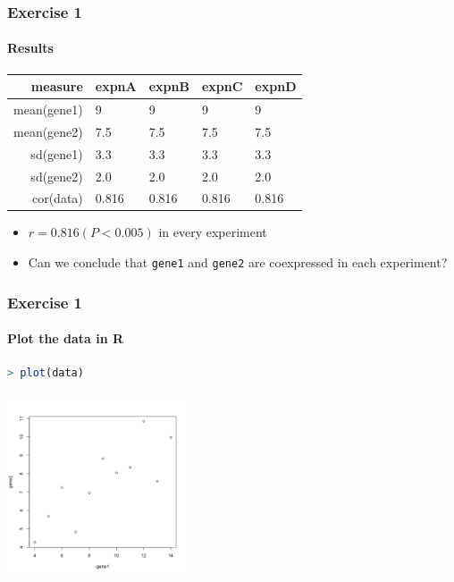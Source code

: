 \documentclass[table]{beamer}
\begin{document}
  \begin{frame}
    \frametitle{Exercise 1}
    \framesubtitle{Results}
    \begin{center}
	\begin{tabular}{r|l|l|l|l}
	  measure & expnA & expnB & expnC & expnD \\
	  \hline
	  mean(gene1) & 9     & 9     & 9     & 9 \\
	  mean(gene2) & 7.5   & 7.5   & 7.5   & 7.5 \\
  	  sd(gene1)   & 3.3   & 3.3   & 3.3   & 3.3 \\
  	  sd(gene2)   & 2.0   & 2.0   & 2.0   & 2.0 \\  
	  cor(data)   & 0.816 & 0.816 & 0.816 & 0.816 \\  
	\end{tabular}
	\end{center}
	\begin{itemize}
      \item<2-> $r=0.816 (P<0.005)$ in every experiment
      \item<2-> Can we conclude that \texttt{gene1} and \texttt{gene2} are coexpressed in each experiment?
    \end{itemize}
  \end{frame}

  \begin{frame}[fragile]
    \frametitle{Exercise 1}
    \framesubtitle{Plot the data in R}
    \begin{lstlisting}[language=R]
> plot(data)
    \end{lstlisting}
      \includegraphics[width=0.4\textwidth]{images/ex1_screenshot_d}        
\end{frame}
\end{document}
